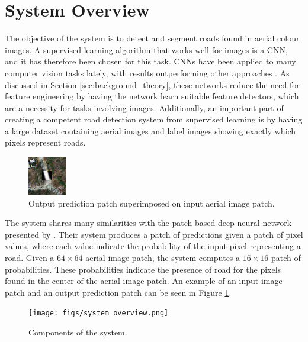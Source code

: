 \section{System Overview}
\label{sec:systemOverview}



The objective of the system is to detect and segment roads found in aerial colour images. A supervised learning algorithm that works well for images is a \ac{CNN}, and it has therefore been chosen for this task. \ac{CNN}s have been applied to many computer vision tasks lately, with results outperforming other approaches \citep{Krizhevsky_imagenet}. As discussed in Section \ref{sec:background_theory}, these networks reduce the need for feature engineering by having the network learn suitable feature detectors, which are a necessity for tasks involving images. Additionally, an important part of creating a competent road detection system from supervised learning is by having a large dataset containing aerial images and label images showing exactly which pixels represent roads.\\

\begin{figure}[t]
\begin{center}
\includegraphics[width=0.15\columnwidth]{figs/labeloverlay.png}
\caption[Input patch and prediction]{Output prediction patch superimposed on input aerial image patch.}
\label{fig:system_data_patch}
\end{center}
\end{figure}

The system shares many similarities with the patch-based deep neural network presented by \cite{Mnih_aerial_images_noisy}. Their system produces a patch of predictions given a patch of pixel values, where each value indicate the probability of the input pixel representing a road. Given a $64 \times 64$ aerial image patch, the system computes a $16 \times 16$ patch of probabilities. These probabilities indicate the presence of road for the pixels found in the center of the aerial image patch. An example of an input image patch and an output prediction patch can be seen in Figure \ref{fig:system_data_patch}.  \\

\begin{figure}[t]
\begin{center}
\texttt{[image: figs/system\_overview.png]}
\caption[Components of the system]{Components of the system.}
\label{fig:system_components}
\end{center}
\end{figure}

